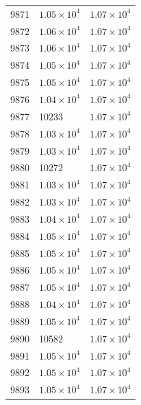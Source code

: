 \begin{table}[H]
\begin{tabular}{lll}
9871 & $\displaystyle 1.05 \times 10^{4}$ & $\displaystyle 1.07 \times 10^{4}$ \\
9872 & $\displaystyle 1.06 \times 10^{4}$ & $\displaystyle 1.07 \times 10^{4}$ \\
9873 & $\displaystyle 1.06 \times 10^{4}$ & $\displaystyle 1.07 \times 10^{4}$ \\
9874 & $\displaystyle 1.05 \times 10^{4}$ & $\displaystyle 1.07 \times 10^{4}$ \\
9875 & $\displaystyle 1.05 \times 10^{4}$ & $\displaystyle 1.07 \times 10^{4}$ \\
9876 & $\displaystyle 1.04 \times 10^{4}$ & $\displaystyle 1.07 \times 10^{4}$ \\
9877 & 10233 & $\displaystyle 1.07 \times 10^{4}$ \\
9878 & $\displaystyle 1.03 \times 10^{4}$ & $\displaystyle 1.07 \times 10^{4}$ \\
9879 & $\displaystyle 1.03 \times 10^{4}$ & $\displaystyle 1.07 \times 10^{4}$ \\
9880 & 10272 & $\displaystyle 1.07 \times 10^{4}$ \\
9881 & $\displaystyle 1.03 \times 10^{4}$ & $\displaystyle 1.07 \times 10^{4}$ \\
9882 & $\displaystyle 1.03 \times 10^{4}$ & $\displaystyle 1.07 \times 10^{4}$ \\
9883 & $\displaystyle 1.04 \times 10^{4}$ & $\displaystyle 1.07 \times 10^{4}$ \\
9884 & $\displaystyle 1.05 \times 10^{4}$ & $\displaystyle 1.07 \times 10^{4}$ \\
9885 & $\displaystyle 1.05 \times 10^{4}$ & $\displaystyle 1.07 \times 10^{4}$ \\
9886 & $\displaystyle 1.05 \times 10^{4}$ & $\displaystyle 1.07 \times 10^{4}$ \\
9887 & $\displaystyle 1.05 \times 10^{4}$ & $\displaystyle 1.07 \times 10^{4}$ \\
9888 & $\displaystyle 1.04 \times 10^{4}$ & $\displaystyle 1.07 \times 10^{4}$ \\
9889 & $\displaystyle 1.05 \times 10^{4}$ & $\displaystyle 1.07 \times 10^{4}$ \\
9890 & 10582 & $\displaystyle 1.07 \times 10^{4}$ \\
9891 & $\displaystyle 1.05 \times 10^{4}$ & $\displaystyle 1.07 \times 10^{4}$ \\
9892 & $\displaystyle 1.05 \times 10^{4}$ & $\displaystyle 1.07 \times 10^{4}$ \\
9893 & $\displaystyle 1.05 \times 10^{4}$ & $\displaystyle 1.07 \times 10^{4}$ \\

\end{tabular}
\end{table}
